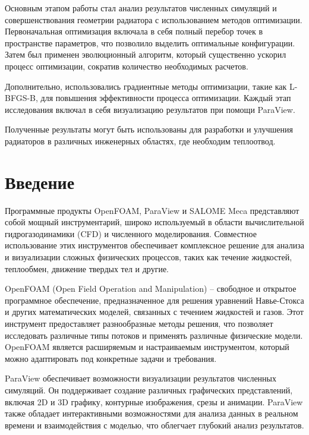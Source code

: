 \documentclass[a4paper,12pt]{article}
\theoremstyle{plain} %
\theoremstyle{definition} %
\theoremstyle{remark} %
\begin{document}
Основным этапом работы стал анализ результатов численных симуляций и совершенствования геометрии радиатора с использованием методов оптимизации. Первоначальная оптимизация включала в себя полный перебор точек в пространстве параметров, что позволило выделить оптимальные конфигурации. Затем был применен эволюционный алгоритм, который существенно ускорил процесс оптимизации, сократив количество необходимых расчетов.

Дополнительно, использовались градиентные методы оптимизации, такие как L-BFGS-B, для повышения эффективности процесса оптимизации. Каждый этап исследования включал в себя визуализацию результатов при помощи ParaView.

Полученные результаты могут быть использованы для разработки и улучшения радиаторов в различных инженерных областях, где необходим теплоотвод.

\newpage 
\tableofcontents
\setcounter{page}{2}

\newpage
\section*{Введение}

Программные продукты OpenFOAM, ParaView и SALOME Meca представляют собой мощный инструментарий, широко используемый в области вычислительной гидрогазодинамики (CFD) и численного моделирования. Совместное использование этих инструментов обеспечивает комплексное решение для анализа и визуализации сложных физических процессов, таких как течение жидкостей, теплообмен, движение твердых тел и другие.

OpenFOAM (Open Field Operation and Manipulation) -- свободное и открытое программное обеспечение, предназначенное для решения уравнений Навье-Стокса и других математических моделей, связанных с течением жидкостей и газов. Этот инструмент предоставляет разнообразные методы решения, что позволяет исследовать различные типы потоков и применять различные физические модели. OpenFOAM является расширяемым и настраиваемым инструментом, который можно адаптировать под конкретные задачи и требования.

ParaView обеспечивает возможности визуализации результатов численных симуляций. Он поддерживает создание различных графических представлений, включая 2D и 3D графику, контурные изображения, срезы и анимации. ParaView также обладает интерактивными возможностями для анализа данных в реальном времени и взаимодействия с моделью, что облегчает глубокий анализ результатов.
\end{document}
